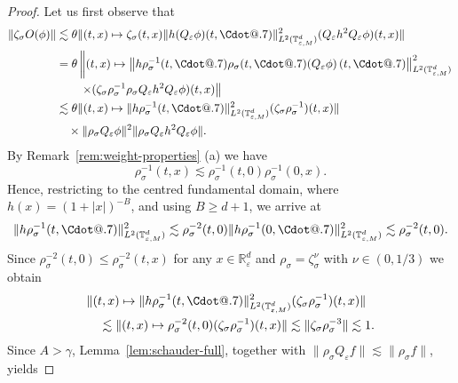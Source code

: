 \documentclass{article}
\makeatletter
\numberwithin{equation}{section}
\newcommand*\Cdot{{\mathpalette\Cdot@{.7}}}
\newcommand*\Cdot@[2]{\mathbin{\vcenter{\hbox{\scalebox{#2}{\hspace{0.1mm}$\m@th#1\bullet$\hspace{0.1mm}}}}}}
\theoremstyle{plain}
\theoremstyle{definition}
\makeatother
\begin{document}
\begin{proof}
  Let us first observe that
  \begin{align*}
    \| \zeta_{\sigma} O (\phi) \| &\lesssim  \theta \| (t, x) \mapsto
    \zeta_{\sigma} (t, x)  \| h (Q_{\varepsilon} \phi) (t, \Cdot) \|_{L^2
    (\mathbb{T}^d_{\varepsilon, M})}^2  (Q_{\varepsilon} h^2 Q_{\varepsilon}
    \phi) (t, x) \|\\
 &=  \theta \left\| (t, x) \mapsto
    \left\| h \rho_{\sigma}^{- 1} (t, \Cdot)
    \rho_{\sigma} (t, \Cdot)  (Q_{\varepsilon} \phi)
    \left( t, \Cdot \right) \right\|_{L^2 (\mathbb{T}^d_{\varepsilon, M})}^2
    \right.\\
 &\qquad \left. \times
    (\zeta_{\sigma} \rho_{\sigma}^{- 1} \rho_{\sigma}
    Q_{\varepsilon} h^2 Q_{\varepsilon} \phi) (t, x) \right\|\\
 &\lesssim  \theta \| (t, x) \mapsto \| h \rho_{\sigma}^{- 1} (t,
    \Cdot) \|_{L^2 (\mathbb{T}^d_{\varepsilon, M})}^2
    (\zeta_{\sigma} \rho_{\sigma}^{- 1}) (t, x)  \|\\
 &\quad \times
    \| \rho_{\sigma} Q_{\varepsilon} \phi \|^2
    \| \rho_{\sigma} Q_{\varepsilon} h^2 Q_{\varepsilon} \phi \| .
  \end{align*}
  By Remark~\ref{rem:weight-properties} (a) we have
  \[ \rho^{- 1}_{\sigma} (t, x) \lesssim \rho^{- 1}_{\sigma} (t, 0) \rho^{-
     1}_{\sigma} (0, x) . \]
  Hence, restricting to the centred fundamental domain, where $h (x) = (1 +
  | x |)^{- B}$, and using $B \geqslant d + 1$, we arrive at
  \[ \| h \rho^{- 1}_{\sigma} (t, \Cdot) \|_{L^2 (\mathbb{T}^d_{\varepsilon,
     M})}^2 \lesssim \rho_{\sigma}^{- 2} (t, 0)  \| h \rho_{\sigma}^{- 1} (0,
     \Cdot)  \|_{L^2 (\mathbb{T}^d_{\varepsilon, M})}^2 \lesssim \rho^{-
     2}_{\sigma} (t, 0) . \]
  Since $\rho^{- 2}_{\sigma} (t, 0) \leqslant \rho^{- 2}_{\sigma} (t, x)$ for
  any $x \in \mathbb{R}^d_{\varepsilon}$ and $\rho_{\sigma} = \zeta_{\sigma}^{\nu}$ with $\nu \in
  (0, 1 / 3)$ we obtain
  \begin{align*}
     &\| (t, x) \mapsto \| h \rho_{\sigma}^{- 1} (t, \Cdot) \|_{L^2
     (\mathbb{T}^d_{\varepsilon, M})}^2
     (\zeta_{\sigma} \rho_{\sigma}^{- 1})(t, x)  \|\\
     &\quad \lesssim \| (t, x) \mapsto \rho^{- 2}_{\sigma} (t, 0)
     (\zeta_{\sigma} \rho_{\sigma}^{- 1})(t, x)  \|
     \lesssim \| \zeta_{\sigma} \rho^{- 3}_{\sigma} \| \lesssim 1.
  \end{align*}
  Since $A > \gamma$, Lemma~\ref{lem:schauder-full}, together with $\|\rho_{\sigma} Q_{\varepsilon}f\|\lesssim \|\rho_\sigma f\|$, yields

\end{proof}
\end{document}

